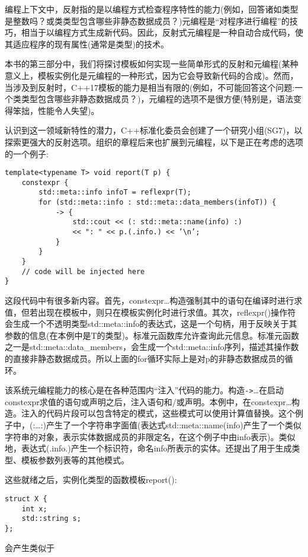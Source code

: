 编程上下文中，反射指的是以编程方式检查程序特性的能力(例如，回答诸如类型是整数吗？或类类型包含哪些非静态数据成员？)元编程是“对程序进行编程”的技巧，相当于以编程方式生成新代码。因此，反射式元编程是一种自动合成代码，使其适应程序的现有属性(通常是类型)的技术。

本书的第三部分中，我们将探讨模板如何实现一些简单形式的反射和元编程(某种意义上，模板实例化是元编程的一种形式，因为它会导致新代码的合成)。然而，当涉及到反射时，C++17模板的能力是相当有限的(例如，不可能回答这个问题:一个类类型包含哪些非静态数据成员？)，元编程的选项不是很方便(特别是，语法变得笨拙，性能令人失望)。

认识到这一领域新特性的潜力，C++标准化委员会创建了一个研究小组(SG7)，以探索更强大的反射选项。组织的章程后来也扩展到元编程，以下是正在考虑的选项的一个例子:

\begin{lstlisting}[style=styleCXX]
template<typename T> void report(T p) {
	constexpr {
		std::meta::info infoT = reflexpr(T);
		for (std::meta::info : std::meta::data_members(infoT)) {
			-> {
				std::cout << (: std::meta::name(info) :)
				<< ": " << p.(.info.) << ’\n’;
			}
		}
	}
	// code will be injected here
}
\end{lstlisting}

这段代码中有很多新内容。首先，constexpr{…}构造强制其中的语句在编译时进行求值，但若出现在模板中，则只在模板实例化时进行求值。其次，reflexpr()操作符会生成一个不透明类型std::meta::info的表达式，这是一个句柄，用于反映关于其参数的信息(在本例中是T的类型)。标准元函数库允许查询此元信息。标准元函数之一是std::meta::data\_members，会生成一个std::meta::info序列，描述其操作数的直接非静态数据成员。所以上面的for循环实际上是对p的非静态数据成员的循环。

该系统元编程能力的核心是在各种范围内“注入”代码的能力。构造\texttt{->}{…}在启动constexpr求值的语句或声明之后，注入语句和/或声明。本例中，在constexpr{…}构造。注入的代码片段可以包含特定的模式，这些模式可以使用计算值替换。这个例子中，(:…:)产生了一个字符串字面值(表达式std::meta::name(info)产生了一个类似字符串的对象，表示实体数据成员的非限定名，在这个例子中由info表示)。类似地，表达式(.info.)产生一个标识符，命名info所表示的实体。还提出了用于生成类型、模板参数列表等的其他模式。

这些就绪之后，实例化类型的函数模板report():

\begin{lstlisting}[style=styleCXX]
struct X {
	int x;
	std::string s;
};
\end{lstlisting}

会产生类似于

